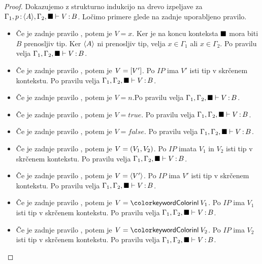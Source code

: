 \begin{proof}
	Dokazujemo z strukturno indukcijo na drevo izpeljave za $\Gamma_1, p \mathinner{:} \langle A \rangle, \Gamma_2, \blacksquare \vdash V \mathinner{:} B$.
	Ločimo primere glede na zadnje uporabljeno pravilo.
	
	\begin{itemize}
		\item Če je zadnje pravilo , potem je $V = x$. Ker je na koncu konteksta $\blacksquare$ mora biti $B$ prenosljiv tip. Ker $\langle A \rangle$ ni prenosljiv tip, velja $x \in \Gamma_1$ ali $x \in \Gamma_2$.
		Po pravilu  velja $\Gamma_1, \Gamma_2, \blacksquare \vdash V \mathinner{:} B$.
		
		\item Če je zadnje pravilo , potem je $V = [V']$.
		Po $IP$ ima $V'$ isti tip v skrčenem kontekstu.
		Po pravilu  velja $\Gamma_1, \Gamma_2, \blacksquare \vdash V \mathinner{:} B$.
		
		\item Če je zadnje pravilo , potem je $V = n$.Po pravilu  velja $\Gamma_1, \Gamma_2, \blacksquare \vdash V \mathinner{:} B$.
		\item Če je zadnje pravilo , potem je $V = true$. Po pravilu  velja $\Gamma_1, \Gamma_2, \blacksquare \vdash V \mathinner{:} B$.
		\item Če je zadnje pravilo , potem je $V = false$. Po pravilu  velja $\Gamma_1, \Gamma_2, \blacksquare \vdash V \mathinner{:} B$.
		
		\item Če je zadnje pravilo , potem je $V =( V_1 , V_2 )$.
		Po $IP$ imata $V_1$ in $V_2$ isti tip v skrčenem kontekstu.
		Po pravilu  velja $\Gamma_1, \Gamma_2, \blacksquare \vdash V \mathinner{:} B$.
		
		\item Če je zadnje pravilo , potem je $V = \langle V' \rangle$.
		Po $IP$ ima $V'$ isti tip v skrčenem kontekstu.
		Po pravilu  velja $\Gamma_1, \Gamma_2, \blacksquare \vdash V \mathinner{:} B$.
		
		\item Če je zadnje pravilo , potem je $V = \tminl{V_1}$.
		Po $IP$ ima $V_1$ isti tip v skrčenem kontekstu.
		Po pravilu  velja $\Gamma_1, \Gamma_2, \blacksquare \vdash V \mathinner{:} B$.
		
		\item Če je zadnje pravilo , potem je $V = \tminl{V_2}$.
		Po $IP$ ima $V_2$ isti tip v skrčenem kontekstu.
		Po pravilu  velja $\Gamma_1, \Gamma_2, \blacksquare \vdash V \mathinner{:} B$.
		

\end{itemize}
\end{proof}
